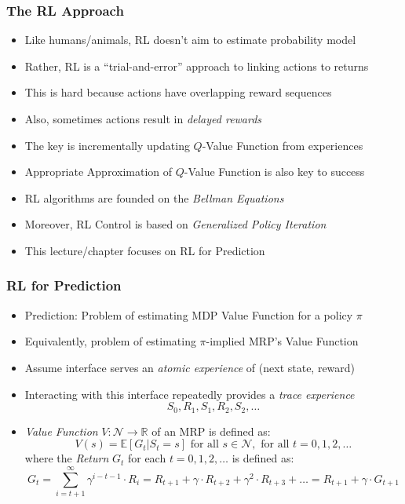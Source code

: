 \documentclass[handout]{beamer}
\begin{document}
\begin{frame}
\frametitle{The RL Approach}
\begin{itemize}[<+->]
\item Like humans/animals, RL doesn't aim to estimate probability model
\item Rather, RL is a ``trial-and-error'' approach to linking actions to returns
\item This is hard because actions have overlapping reward sequences
\item Also, sometimes actions result in {\em delayed rewards}
\item The key is incrementally updating $Q$-Value Function from experiences
\item Appropriate Approximation of $Q$-Value Function is also key to success
\item RL algorithms are founded on the {\em Bellman Equations}
\item Moreover, RL Control is based on {\em Generalized Policy Iteration}
\item This lecture/chapter focuses on RL for Prediction
\end{itemize}
\end{frame}


\begin{frame}
\frametitle{RL for Prediction}
\pause
\begin{itemize}[<+->]
\item Prediction: Problem of estimating MDP Value Function for a policy $\pi$
\item Equivalently, problem of estimating $\pi$-implied MRP's Value Function
\item Assume interface serves an {\em atomic experience} of (next state, reward)
\item Interacting with this interface repeatedly provides a {\em trace experience}
$$S_0, R_1, S_1, R_2, S_2, \ldots$$
\item {\em Value Function} $V: \mathcal{N} \rightarrow \mathbb{R}$ of an MRP is defined as:
$$V(s) = \mathbb{E}[G_t|S_t = s] \text{ for all } s \in \mathcal{N}, \text{ for all } t = 0, 1, 2, \ldots$$
where the {\em Return} $G_t$ for each $t = 0, 1, 2, \ldots$ is defined as:
$$G_t = \sum_{i=t+1}^{\infty} \gamma^{i-t-1} \cdot R_i = R_{t+1} + \gamma \cdot R_{t+2} + \gamma^2 \cdot R_{t+3} + \ldots = R_{t+1} + \gamma \cdot G_{t+1}$$
\end{itemize}
\end{frame}
\end{document}
